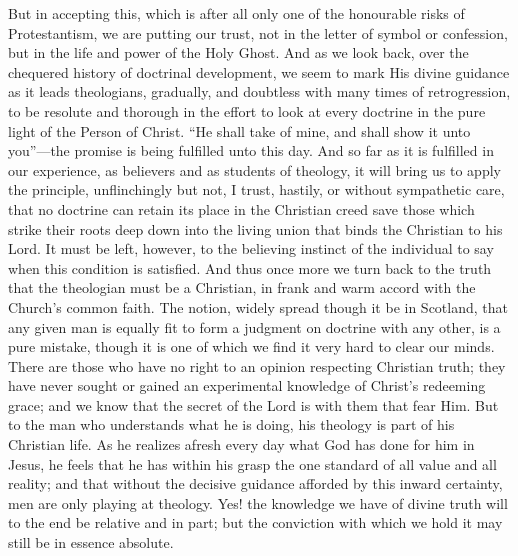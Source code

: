 \documentclass[12pt,a5paper]{article}
\begin{document}
But in accepting this, which is after all only one of the
honourable risks of Protestantism, we are putting our trust,
not in the letter of symbol or confession, but in the life
and power of the Holy Ghost. And as we look back, over
the chequered history of doctrinal development, we seem to
mark His divine guidance as it leads theologians, gradually,
and doubtless with many times of retrogression, to be
resolute and thorough in the effort to look at every doctrine
in the pure light of the Person of Christ. ``He shall take
of mine, and shall show it unto you''---the promise is being
fulfilled unto this day. And so far as it is fulfilled in our
experience, as believers and as students of theology, it will
bring us to apply the principle, unflinchingly but not, I
trust, hastily, or without sympathetic care, that no doctrine
can retain its place in the Christian creed save those
which strike their roots deep down into the living union
that binds the Christian to his Lord. It must be
left, however, to the believing instinct of the individual to
say when this condition is satisfied. And thus once more
we turn back to the truth that the theologian must be a
Christian, in frank and warm accord with the Church's
common faith. The notion, widely spread though it be
in Scotland, that any given man is equally fit to form a
judgment on doctrine with any other, is a pure mistake,
though it is one of which we find it very hard to clear our
minds. There are those who have no right to an opinion
respecting Christian truth; they have never sought or
gained an experimental knowledge of Christ's redeeming
grace; and we know that the secret of the Lord is with
them that fear Him. But to the man who understands
what he is doing, his theology is part of his Christian life.
As he realizes afresh every day what God has done for him
in Jesus, he feels that he has within his grasp the one
standard of all value and all reality; and that without the
decisive guidance afforded by this inward certainty, men
are only playing at theology. Yes! the knowledge we
have of divine truth will to the end be relative and in part;
but the conviction with which we hold it may still be in
essence absolute.
\end{document}

